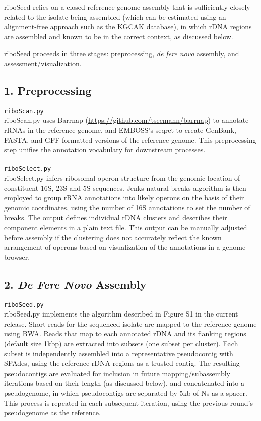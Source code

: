 \documentclass[a4,center,fleqn]{NAR}
\begin{document}
riboSeed relies on a closed reference genome assembly that is sufficiently closely-related to the isolate being assembled (which can be estimated using an alignment-free approach such as the KGCAK database\cite{Wang2015b}), in which rDNA regions are assembled and known to be in the correct context, as discussed below.

riboSeed proceeds in three stages: preprocessing, \textit{de fere novo} assembly, and assessment/visualization.
\subsection*{1. Preprocessing}

\texttt{riboScan.py}\\
riboScan.py uses Barrnap (\url{https://github.com/tseemann/barrnap}) to annotate rRNAs in the reference genome, and EMBOSS's seqret\cite{Rice2000a} to create GenBank, FASTA, and GFF formatted versions of the reference genome. This preprocessing step unifies the annotation vocabulary for downstream processes.\\
\\
\texttt{riboSelect.py}\\
riboSelect.py infers ribosomal operon structure from the genomic location of constituent 16S, 23S and 5S sequences. Jenks natural breaks algorithm is then employed to group rRNA annotations into likely operons on the basis of their genomic coordinates, using the number of 16S annotations to set the number of breaks. The output defines individual rDNA clusters and describes their component elements in a plain text file. This output can be manually adjusted before assembly if the clustering does not accurately reflect the known arrangement of operons based on visualization of the annotations in a genome browser.

\subsection*{2. \textit{De Fere Novo} Assembly}

\texttt{riboSeed.py}\\
riboSeed.py implements the algorithm described in Figure S1 in the current release. Short reads for the sequenced isolate are mapped to the reference genome using BWA\cite{Li2009}. Reads that map to each annotated rDNA and its flanking regions (default size 1kbp) are extracted into subsets (one subset per cluster). Each subset is independently assembled into a representative pseudocontig with SPAdes\cite{Bankevich2012}, using the reference rDNA regions as a trusted contig. The resulting pseudocontigs are evaluated for inclusion in future mapping/subassembly iterations based on their length (as discussed below), and concatenated into a pseudogenome, in which pseudocontigs are separated by 5kb of Ns as a spacer. This process is repeated in each subsequent iteration, using the previous round's pseudogenome as the reference.
\end{document}
